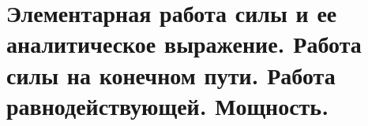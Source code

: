 \chapter{Элементарная работа силы и ее аналитическое выражение. Работа силы на
конечном пути. Работа равнодействующей. Мощность.}

\newpage
